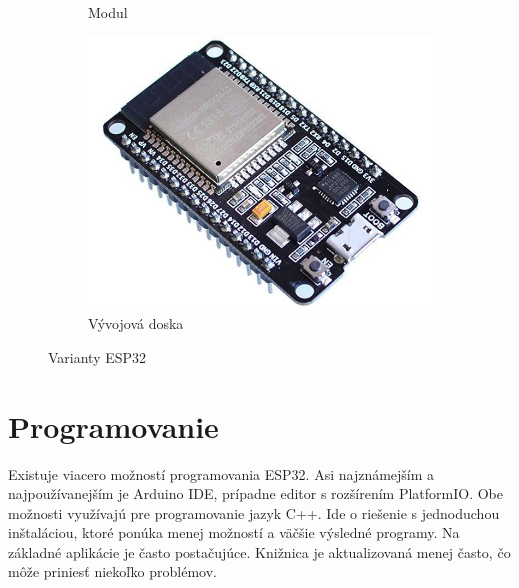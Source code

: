 \begin{figure}[ht]
\begin{subfigure}{.3\textwidth}
      \caption{Modul\footnotemark[3]}
      \label{fig:esp32_module}
    \end{subfigure}
    \begin{subfigure}{.3\textwidth}
      \centering
      \includegraphics[width=.8\linewidth]{obrazky-figures/esp-dev.png}
      \caption{Vývojová doska\footnotemark[4]}
      \label{fig:esp32_dev}
    \end{subfigure}
    \caption{Varianty ESP32}
    \label{fig:esp32_varianty}
\end{figure}


\section{Programovanie}

Existuje viacero možností programovania ESP32. Asi najznámejším a najpoužívanejším je Arduino IDE, prípadne editor s rozšírením PlatformIO. Obe možnosti využívajú pre programovanie jazyk C++. Ide o riešenie s jednoduchou inštaláciou, ktoré ponúka menej možností a väčšie výsledné programy. Na základné aplikácie je často postačujúce. Knižnica je aktualizovaná menej často, čo môže priniesť niekoľko problémov.

